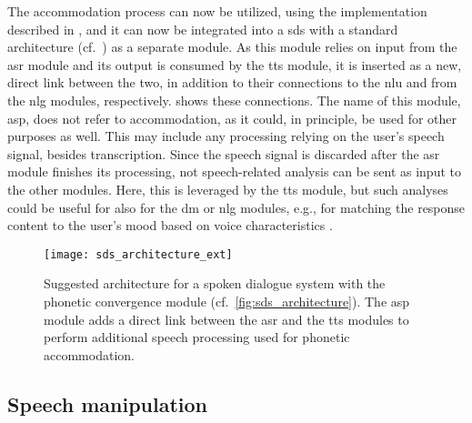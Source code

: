 The accommodation process can now be utilized, using the implementation described in , and it can now be integrated into a \ac{sds} with a standard architecture (cf.\ ) as a separate module.
As this module relies on input from the \ac{asr} module and its output is consumed by the \ac{tts} module, it is inserted as a new, direct link between the two, in addition to their connections to the \ac{nlu} and from the \ac{nlg} modules, respectively.
 shows these connections.
The name of this module, \acf{asp}, does not refer to accommodation, as it could, in principle, be used for other purposes as well.
This may include any processing relying on the user's speech signal, besides transcription.
Since the speech signal is discarded after the \ac{asr} module finishes its processing, not speech-related analysis can be sent as input to the other modules.
Here, this is leveraged by the \ac{tts} module, but such analyses could be useful for also for the \ac{dm} or \ac{nlg} modules, e.g., for matching the response content to the user's mood based on voice characteristics \citep{Braun2016assessing, Rothkrantz2004voice}.
%
\begin{figure}[t]
	\centering
	\texttt{[image: sds\_architecture\_ext]}
	\caption[Proposed extended architecture of a spoken dialogue system]
		{Suggested architecture for a spoken dialogue system with the phonetic convergence module (cf.\ \cref{fig:sds_architecture}).
		The \acs{asp} module adds a direct link between the \ac{asr} and the \ac{tts} modules to perform additional speech processing used for phonetic accommodation.}
	\label{fig:adaptation_module_architecture}
\end{figure}

\subsection{Speech manipulation}
\label{subsec:speech_manipulation}

